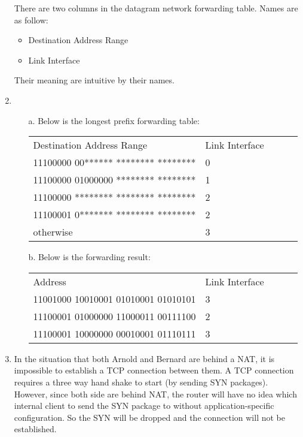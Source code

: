 \documentclass[12pt]{article}
\begin{document}
\begin{singlespace}
\begin{enumerate}
	There are two columns in the datagram network forwarding table. Names are as follow:
	\begin{itemize}
	\item Destination Address Range
	\item Link Interface
	\end{itemize}
	Their meaning are intuitive by their names.
\item
	\begin{itemize}
	\item [a.] Below is the longest prefix forwarding table:
		\begin{table}[h]
			\centering
			\label{my-label}
			\begin{tabular}{|l|l|lll}
			\cline{1-2}
			Destination Address Range           & Link Interface &  &  &  \\ \cline{1-2}
			11100000 00****** ******** ******** & 0              &  &  &  \\ \cline{1-2}
			11100000 01000000 ******** ******** & 1              &  &  &  \\ \cline{1-2}
			11100000 ******** ******** ******** & 2              &  &  &  \\ \cline{1-2}
			11100001 0******* ******** ******** & 2              &  &  &  \\ \cline{1-2}
			otherwise                           & 3              &  &  &  \\ \cline{1-2}
			\end{tabular}
		\end{table}
	\item [b.] Below is the forwarding result:
		\begin{table}[h]
			\centering
			\label{my-label}
			\begin{tabular}{|l|l|lll}
			\cline{1-2}
			Address           & Link Interface &  &  &  \\ \cline{1-2}
			11001000 10010001 01010001 01010101 & 3              &  &  &  \\ \cline{1-2}
			11100001 01000000 11000011 00111100 & 2              &  &  &  \\ \cline{1-2}
			11100001 10000000 00010001 01110111 & 3              &  &  &  \\ \cline{1-2}
			\end{tabular}
		\end{table}
	\end{itemize}
\item
	In the situation that both Arnold and Bernard are behind a NAT, it is impossible to establish a TCP connection between them. A TCP connection requires a three way hand shake to start (by sending SYN packages). However, since both side are behind NAT, the router will have no idea which internal client to send the SYN package to without application-specific configuration. So the SYN will be dropped and the connection will not be established.


\end{enumerate}
\end{singlespace}
\end{document}
